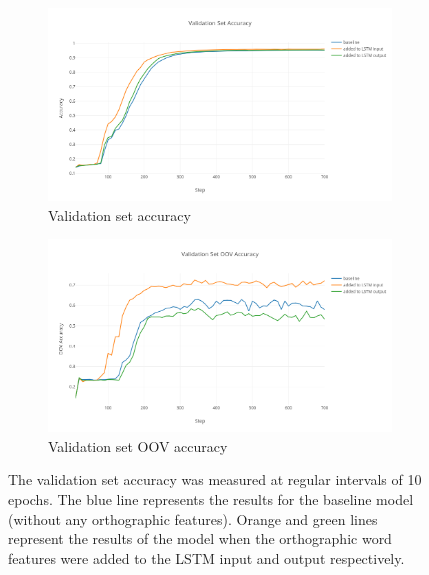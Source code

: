\documentclass[11pt,letterpaper]{article}
\begin{document}
\begin{figure}[htbp]
	\centering
	\captionsetup{justification=centering}
	\begin{subfigure}[b]{0.48\textwidth}
		\centering
		\includegraphics[width=\linewidth]{Validation-Accuracy}
		\caption{Validation set accuracy}
		\label{a}
	\end{subfigure}
	\centering
	\begin{subfigure}[b]{0.48\textwidth}
		\centering
		\includegraphics[width=\linewidth]{Validation-OOV-Accuracy}
		\caption{Validation set OOV accuracy}
		\label{b}
	\end{subfigure}
	\caption{The validation set accuracy was measured at regular intervals of 10 epochs. The blue line represents the results for the baseline model (without any orthographic features). Orange and green lines represent the results of the model when the orthographic word features were added to the LSTM input and output respectively.}
	\label{fig:graphs}
\end{figure}
\end{document}
